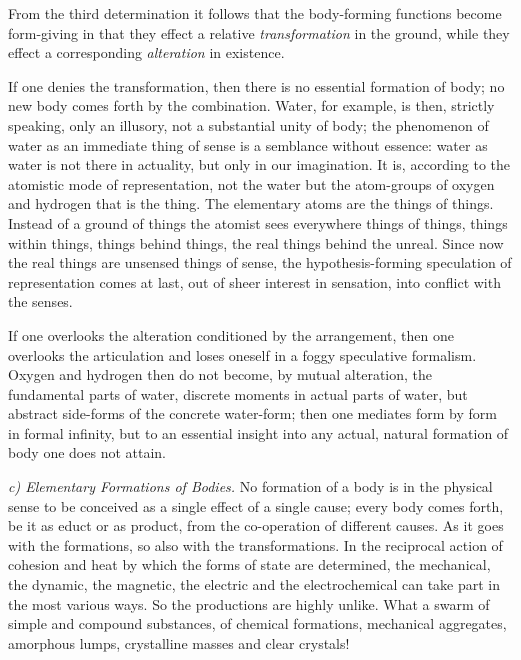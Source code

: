 \documentclass[12pt,a4paper]{book}
\newcommand{\runin}[1]{\emph{#1}\hspace{0.4em}}
\begin{document}
From the third determination it follows that the body-forming functions become form-giving in that they effect a relative
\emph{transformation} in the ground, while they effect a corresponding \emph{alteration} in existence.

If one denies the transformation, then there is no essential formation of body; no new body comes forth by the
combination. Water, for example, is then, strictly speaking, only an illusory, not a substantial unity of body; the
phenomenon of water as an immediate thing of sense is a semblance without essence: water as water is not there in
actuality, but only in our imagination. It is, according to the atomistic mode of representation, not the water but the
atom-groups of oxygen and hydrogen that is the thing. The elementary atoms are the things of things. Instead of a ground
of things the atomist sees everywhere things of things, things within things, things behind things, the real things
behind the unreal. Since now the real things are unsensed things of sense, the hypothesis-forming speculation of
representation comes at last, out of sheer interest in sensation, into conflict with the senses.

If one overlooks the alteration conditioned by the arrangement, then one overlooks the articulation and loses oneself in
a foggy speculative formalism. Oxygen and hydrogen then do not become, by
mutual alteration, the fundamental parts of water, discrete moments in actual parts of water, but abstract side-forms of
the concrete water-form; then one mediates form by form in formal infinity, but to an essential insight into any actual,
natural formation of body one does not attain.

\runin{c) Elementary Formations of Bodies.} No formation of a body is in the physical sense to be conceived as a single
effect of a single cause; every body comes forth, be it as educt or as product, from the co-operation of different
causes. As it goes with the formations, so also with the transformations. In the reciprocal action of cohesion and heat
by which the forms of state are determined, the mechanical, the dynamic, the magnetic, the electric and the
electrochemical can take part in the most various ways. So the productions are highly unlike. What a swarm of simple and
compound substances, of chemical formations, mechanical aggregates, amorphous lumps, crystalline masses and clear
crystals!
\end{document}
